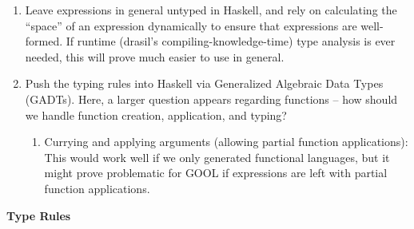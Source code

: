 \begin{enumerate}

    \item Leave expressions in general untyped in Haskell, and rely on calculating
          the ``space'' of an expression dynamically to ensure that expressions are
          well-formed. If runtime (drasil's compiling-knowledge-time) type analysis
          is ever needed, this will prove much easier to use in general.
    
    \item Push the typing rules into Haskell via Generalized Algebraic Data Types (GADTs).
          Here, a larger question appears regarding functions -- how should we handle
          function creation, application, and typing?
          
          \begin{enumerate}

              \item Currying and applying arguments (allowing partial function applications):
                    This would work well if we only generated functional languages, but it might
                    prove problematic for GOOL if expressions are left with partial function
                    applications.

          \end{enumerate}
          
\end{enumerate}

\textbf{Type Rules}

